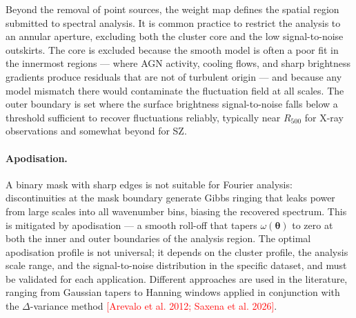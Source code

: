 Beyond the removal of point sources, the weight map defines the spatial region submitted to spectral analysis. It is common practice to restrict the analysis to an annular aperture, excluding both the cluster core and the low signal-to-noise outskirts. The core is excluded because the smooth model is often a poor fit in the innermost regions — where AGN activity, cooling flows, and sharp brightness gradients produce residuals that are not of turbulent origin — and because any model mismatch there would contaminate the fluctuation field at all scales. The outer boundary is set where the surface brightness signal-to-noise falls below a threshold sufficient to recover fluctuations reliably, typically near $R_{500}$ for X-ray observations and somewhat beyond for SZ.

\paragraph{Apodisation.}
A binary mask with sharp edges is not suitable for Fourier analysis: discontinuities at the mask boundary generate Gibbs ringing that leaks power from large scales into all wavenumber bins, biasing the recovered spectrum. This is mitigated by apodisation — a smooth roll-off that tapers $\omega(\boldsymbol{\theta})$ to zero at both the inner and outer boundaries of the analysis region. The optimal apodisation profile is not universal; it depends on the cluster profile, the analysis scale range, and the signal-to-noise distribution in the specific dataset, and must be validated for each application. Different approaches are used in the literature, ranging from Gaussian tapers to Hanning windows applied in conjunction with the $\Delta$-variance method \textcolor{red}{[Arevalo et al. 	2012; Saxena et al. 2026]}.

